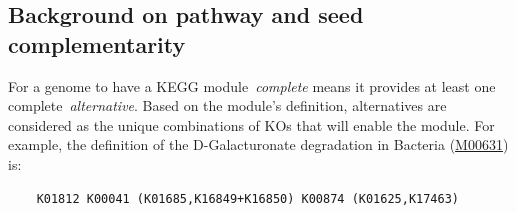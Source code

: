 \documentclass[sn-mathphys,Numbered]{sn-jnl}  %
\theoremstyle{thmstyleone}%
\theoremstyle{thmstyletwo}%
\theoremstyle{thmstylethree}%
\begin{document}
\begin{appendices}













    \section{Background on pathway and seed complementarity}
    \label{app:pathcompl}

        For a genome to have a KEGG module~\textit{complete} means it provides at least one complete~\textit{alternative}.
        Based on the module's definition, alternatives are considered as the unique combinations of KOs that will enable the module.
        For example, the definition of the D-Galacturonate degradation in Bacteria (\href{https://www.genome.jp/dbget-bin/www_bget?M00631}{M00631}) is:
        \bigskip
        \begin{verbatim}    K01812 K00041 (K01685,K16849+K16850) K00874 (K01625,K17463)\end{verbatim}
        \bigskip
        

\end{appendices}
\end{document}
